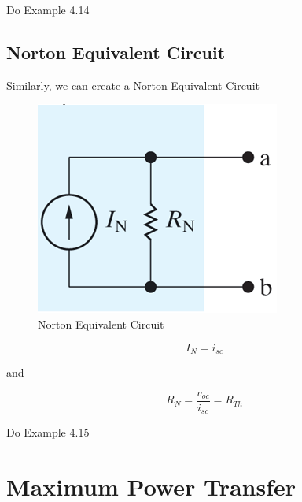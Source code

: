 \documentclass[14pt]{memoir}
\begin{document}
\begin{tcolorbox}
Do Example 4.14
\end{tcolorbox}


\subsection{Norton Equivalent Circuit}

Similarly, we can create a Norton Equivalent Circuit

\begin{figure}[H]
\begin{center}
\includegraphics[scale=0.50]{fig/fig04_50.png}
\caption{Norton Equivalent Circuit}
\label{fig:fig04_50}
\end{center}
\end{figure}

\begin{equation}
I_N = i_{sc}
\end{equation}

and

\begin{equation}
R_N = \frac{v_{oc}}{i_{sc}} = R_{Th}
\end{equation}

\begin{tcolorbox}
Do Example 4.15
\end{tcolorbox}

\section{Maximum Power Transfer}
\end{document}
